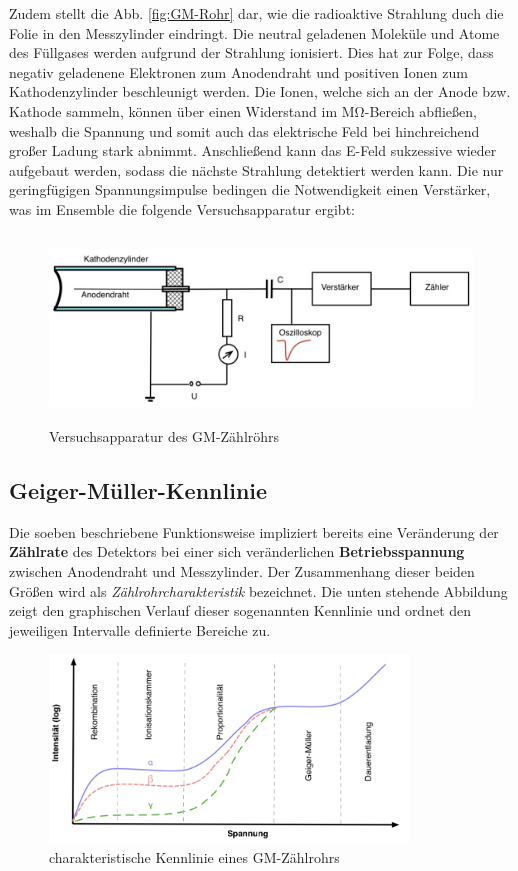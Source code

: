 \noindent Zudem stellt die Abb. \ref{fig:GM-Rohr} dar, wie die radioaktive Strahlung duch die Folie in den Messzylinder 
eindringt. Die neutral geladenen Moleküle und Atome des Füllgases werden aufgrund der Strahlung ionisiert. Dies hat zur 
Folge, dass negativ geladenene Elektronen zum Anodendraht und positiven Ionen zum Kathodenzylinder beschleunigt werden.
Die Ionen, welche sich an der Anode bzw. Kathode sammeln, können über einen Widerstand im $\unit{\mega\ohm}$-Bereich 
abfließen, weshalb die Spannung und somit auch das elektrische Feld bei hinchreichend großer Ladung stark abnimmt. 
Anschließend kann das E-Feld sukzessive wieder aufgebaut werden, sodass die nächste Strahlung detektiert werden kann.
Die nur geringfügigen Spannungsimpulse bedingen die Notwendigkeit einen Verstärker, was im Ensemble die folgende 
Versuchsapparatur ergibt:

\begin{figure}[H]
    \centering 
    \includegraphics[height=5cm]{content/Apparatur.png}
    \caption{Versuchsapparatur des GM-Zählröhrs\cite{Versuchsanleitung_v703}}
    \label{fig:GM-Apparatur}
\end{figure}

\subsection{Geiger-Müller-Kennlinie}

\noindent Die soeben beschriebene Funktionsweise impliziert bereits eine Veränderung der \textbf{Zählrate} des Detektors bei 
einer sich veränderlichen \textbf{Betriebsspannung} zwischen Anodendraht und Messzylinder. Der Zusammenhang dieser beiden 
Größen wird als \emph{Zählrohrcharakteristik} bezeichnet. Die unten stehende Abbildung zeigt den graphischen Verlauf 
dieser sogenannten Kennlinie und ordnet den jeweiligen Intervalle definierte Bereiche zu.

\begin{figure}[H]
    \centering 
    \includegraphics[height=5cm]{content/Kennlinie.png}
    \caption{charakteristische Kennlinie eines GM-Zählrohrs\cite{KennlinieGM}}
    \label{fig:Kennlinie}
\end{figure}

